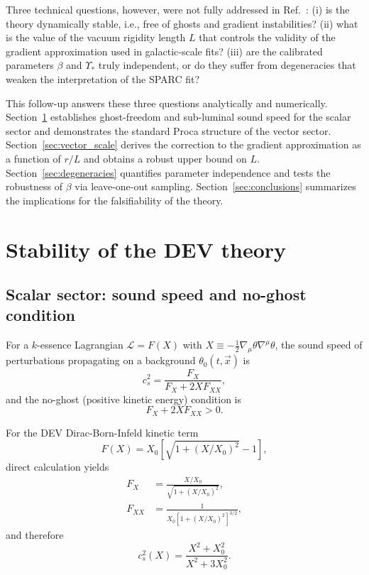 \documentclass[aps,prd,reprint,floatfix,nofootinbib,superscriptaddress]{revtex4-2}
\newcommand{\Xzero}{X_0}
\newcommand{\cs}{c_s}
\begin{document}
Three technical questions, however, were not fully addressed in
Ref.~\cite{Mendes2026}: (i) is the theory dynamically stable, i.e.,
free of ghosts and gradient instabilities? (ii) what is the value of
the vacuum rigidity length $L$ that controls the validity of the
gradient approximation used in galactic-scale fits? (iii) are the
calibrated parameters $\beta$ and $\Upsilon_*$ truly independent, or
do they suffer from degeneracies that weaken the interpretation of
the SPARC fit?

This follow-up answers these three questions analytically and
numerically. Section~\ref{sec:stability} establishes
ghost-freedom and sub-luminal sound speed for the scalar sector and
demonstrates the standard Proca structure of the vector sector.
Section~\ref{sec:vector_scale} derives the correction to the
gradient approximation as a function of $r/L$ and obtains a robust
upper bound on $L$. Section~\ref{sec:degeneracies} quantifies
parameter independence and tests the robustness of $\beta$ via
leave-one-out sampling. Section~\ref{sec:conclusions} summarizes the
implications for the falsifiability of the theory.

\section{Stability of the DEV theory}
\label{sec:stability}

\subsection{Scalar sector: sound speed and no-ghost condition}

For a $k$-essence Lagrangian $\mathcal{L} = F(X)$ with
$X \equiv -\frac{1}{2}\nabla_\mu\theta\nabla^\mu\theta$, the sound
speed of perturbations propagating on a background $\theta_0(t,\vec{x})$
is~\cite{ArmendarizPicon1999}
\begin{equation}
  \cs^2 = \frac{F_X}{F_X + 2X F_{XX}},
  \label{eq:cs_general}
\end{equation}
and the no-ghost (positive kinetic energy) condition is
\begin{equation}
  F_X + 2X F_{XX} > 0.
  \label{eq:noghost_general}
\end{equation}

For the DEV Dirac-Born-Infeld kinetic term
\begin{equation}
  F(X) = \Xzero\!\left[\sqrt{1 + (X/\Xzero)^2} - 1\right],
\end{equation}
direct calculation yields
\begin{align}
  F_X &= \frac{X/\Xzero}{\sqrt{1+(X/\Xzero)^2}}, \\
  F_{XX} &= \frac{1}{\Xzero[1+(X/\Xzero)^2]^{3/2}},
\end{align}
and therefore
\begin{equation}
  \boxed{\cs^2(X) = \frac{X^2 + \Xzero^2}{X^2 + 3\Xzero^2}.}
  \label{eq:cs_DBI}
\end{equation}
\end{document}
